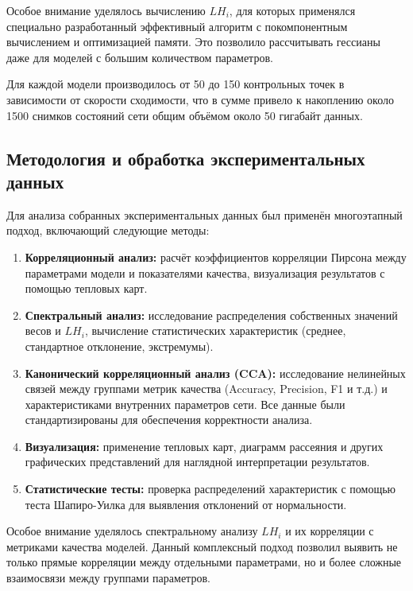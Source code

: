 \documentclass[a4paper,12pt]{article}
\begin{document}
Особое внимание уделялось вычислению $LH_i$, для которых применялся специально разработанный
эффективный алгоритм с покомпонентным вычислением и оптимизацией памяти. Это позволило рассчитывать гессианы
даже для моделей с большим количеством параметров.

Для каждой модели производилось от 50 до 150 контрольных точек в зависимости от скорости сходимости, что в
сумме привело к накоплению около 1500 снимков состояний сети общим объёмом около 50 гигабайт данных.

\subsection{Методология и обработка экспериментальных данных}

Для анализа собранных экспериментальных данных был применён многоэтапный подход, включающий следующие методы:

\begin{enumerate}
  \item \textbf{Корреляционный анализ:} расчёт коэффициентов корреляции Пирсона между параметрами модели
    и показателями качества, визуализация результатов с помощью тепловых карт.

  \item \textbf{Спектральный анализ:} исследование распределения собственных значений весов и $LH_i$,
    вычисление статистических характеристик (среднее, стандартное отклонение, экстремумы).

  \item \textbf{Канонический корреляционный анализ (CCA):} исследование нелинейных связей между группами
    метрик качества (Accuracy, Precision, F1 и т.д.) и характеристиками внутренних параметров сети. Все данные
    были стандартизированы для обеспечения корректности анализа.

  \item \textbf{Визуализация:} применение тепловых карт, диаграмм рассеяния и других графических представлений
    для наглядной интерпретации результатов.

  \item \textbf{Статистические тесты:} проверка распределений характеристик с помощью теста Шапиро-Уилка
    \cite{shapiro1965} для выявления отклонений от нормальности.
\end{enumerate}

Особое внимание уделялось спектральному анализу $LH_i$ и их корреляции с метриками качества
моделей. Данный комплексный подход позволил выявить не только прямые корреляции между отдельными
параметрами, но и более сложные взаимосвязи между группами параметров.
\end{document}
